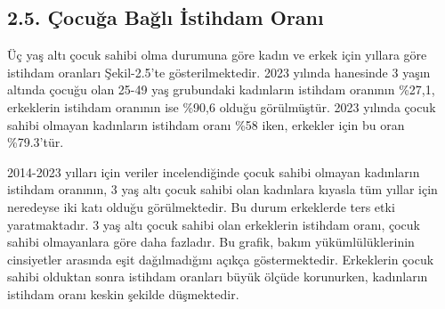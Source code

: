 \documentclass[
  11pt,
  a4paper,
  DIV=11,
  numbers=noendperiod]{scrartcl}
\begin{document}
\subsection{2.5. Çocuğa Bağlı İstihdam
Oranı}\label{uxe7ocuux11fa-baux11flux131-istihdam-oranux131}

Üç yaş altı çocuk sahibi olma durumuna göre kadın ve erkek için yıllara
göre istihdam oranları Şekil-2.5'te gösterilmektedir. 2023 yılında
hanesinde 3 yaşın altında çocuğu olan 25-49 yaş grubundaki kadınların
istihdam oranının \%27,1, erkeklerin istihdam oranının ise \%90,6 olduğu
görülmüştür. 2023 yılında çocuk sahibi olmayan kadınların istihdam oranı
\%58 iken, erkekler için bu oran \%79.3'tür.

2014-2023 yılları için veriler incelendiğinde çocuk sahibi olmayan
kadınların istihdam oranının, 3 yaş altı çocuk sahibi olan kadınlara
kıyasla tüm yıllar için neredeyse iki katı olduğu görülmektedir. Bu
durum erkeklerde ters etki yaratmaktadır. 3 yaş altı çocuk sahibi olan
erkeklerin istihdam oranı, çocuk sahibi olmayanlara göre daha fazladır.
Bu grafik, bakım yükümlülüklerinin cinsiyetler arasında eşit
dağılmadığını açıkça göstermektedir. Erkeklerin çocuk sahibi olduktan
sonra istihdam oranları büyük ölçüde korunurken, kadınların istihdam
oranı keskin şekilde düşmektedir.
\end{document}
